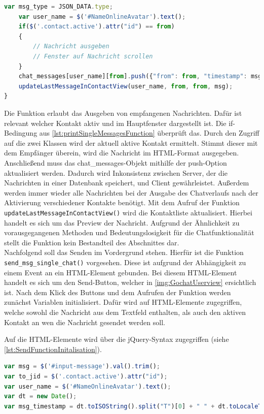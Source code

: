 \documentclass[a4paper,titlepage,halfparskip,12pt]{scrreprt}
\begin{document}
\begin{onehalfspacing}
\begin{lstlisting}[language=Javascript,caption=Funktion und Datenverarbeitung des JSON-Objektes ,label={lst:printSingleMessagesFunction}]
	var msg_type = JSON_DATA.type;
	var user_name = $('#NameOnlineAvatar').text(); 
	if($('.contact.active').attr("id") == from) 
	{
		// Nachricht ausgeben
		// Fenster auf Nachricht scrollen
	}
	chat_messages[user_name][from].push({"from": from, "timestamp": msg_timestamp, "txt": msg, "type": "chat"});
	updateLastMessageInContactView(user_name, from, from, msg);
}
\end{lstlisting}
Die Funktion erlaubt das Ausgeben von empfangenen Nachrichten. Dafür ist relevant welcher Kontakt aktiv und im Hauptfenster dargestellt ist. Die if-Bedingung aus \autoref{lst:printSingleMessagesFunction} überprüft das. Durch den Zugriff auf die zwei Klassen wird der aktuell aktive Kontakt ermittelt. Stimmt dieser mit dem Empfänger überein, wird die Nachricht im HTML-Format ausgegeben. Anschließend muss das chat\_messages-Objekt mithilfe der push-Option aktualisiert werden. Dadurch wird Inkonsistenz zwischen Server, der die Nachrichten in einer Datenbank speichert, und Client gewährleistet. Außerdem werden immer wieder alle Nachrichten bei der Ausgabe des Chatverlaufs nach der Aktivierung verschiedener Kontakte benötigt. Mit dem Aufruf der Funktion \texttt{updateLastMessageInContactView()} wird die Kontaktliste aktualisiert. Hierbei handelt es sich um das Preview der Nachricht. Aufgrund der Ähnlichkeit zu vorausgegangenen Methoden und Bedeutungslosigkeit für die Chatfunktionalität stellt die Funktion kein Bestandteil des Abschnittes dar. \\
Nachfolgend soll das Senden im Vordergrund stehen. Hierfür ist die Funktion \texttt{send\_msg\_single\_chat()} vorgesehen. Diese ist aufgrund der Abhängigkeit zu einem Event an ein \ac{HTML}-Element gebunden. Bei diesem \ac{HTML}-Element handelt es sich um den \glqq Send\grqq-Button, welcher in \autoref{img:GochatUserview} ersichtlich ist. Nach dem Klick des Buttons und dem Aufrufen der Funktion werden zunächst Variablen initialisiert. Dafür wird auf \ac{HTML}-Elemente zugegriffen, welche sowohl die Nachricht aus dem Textfeld enthalten, als auch den aktiven Kontakt an wen die Nachricht gesendet werden soll.

Auf die \ac{HTML}-Elemente wird über die jQuery-Syntax zugegriffen (siehe \autoref{lst:SendFunctionInitalisation}).
\begin{lstlisting}[language=Javascript,caption=Initialisierung der Variablen zum Senden einer Nachricht ,label={lst:SendFunctionInitalisation}]
var msg = $('#input-message').val().trim();
var to_jid = $('.contact.active').attr("id");
var user_name = $('#NameOnlineAvatar').text();
var dt = new Date();
var msg_timestamp = dt.toISOString().split("T")[0] + " " + dt.toLocaleTimeString().substring(0,5); 
\end{lstlisting}


\end{onehalfspacing}
\end{document}
